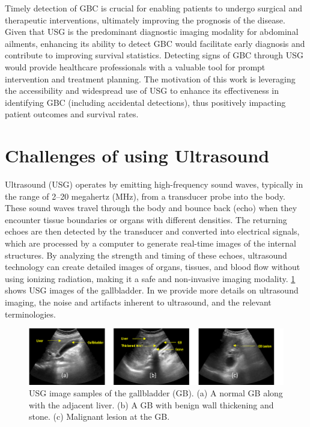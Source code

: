 \par Timely detection of GBC is crucial for enabling patients to undergo surgical and therapeutic interventions, ultimately improving the prognosis of the disease. Given that USG is the predominant diagnostic imaging modality for abdominal ailments, enhancing its ability to detect GBC would facilitate early diagnosis and contribute to improving survival statistics. Detecting signs of GBC through USG would provide healthcare professionals with a valuable tool for prompt intervention and treatment planning. The motivation of this work is leveraging the accessibility and widespread use of USG to enhance its effectiveness in identifying GBC (including accidental detections), thus positively impacting patient outcomes and survival rates.  

\section{Challenges of using Ultrasound}
%
Ultrasound (USG) operates by emitting high-frequency sound waves, typically in the range of 2--20 megahertz (MHz), from a transducer probe into the body. These sound waves travel through the body and bounce back (echo) when they encounter tissue boundaries or organs with different densities. The returning echoes are then detected by the transducer and converted into electrical signals, which are processed by a computer to generate real-time images of the internal structures. By analyzing the strength and timing of these echoes, ultrasound technology can create detailed images of organs, tissues, and blood flow without using ionizing radiation, making it a safe and non-invasive imaging modality. \cref{fig:usg_sample} shows USG images of the gallbladder. 
In  we provide more details on ultrasound imaging, the noise and artifacts inherent to ultrasound, and the relevant terminologies.


\begin{figure}[t]
    \centering
    \includegraphics[width=0.95\linewidth]{figs/usg_sample.png}
    \caption[Ultrasound image samples]{USG image samples of the gallbladder (GB). (a) A normal GB along with the adjacent liver. (b) A GB with benign wall thickening and stone. (c) Malignant lesion at the GB.}
    \label{fig:usg_sample}
\end{figure}


